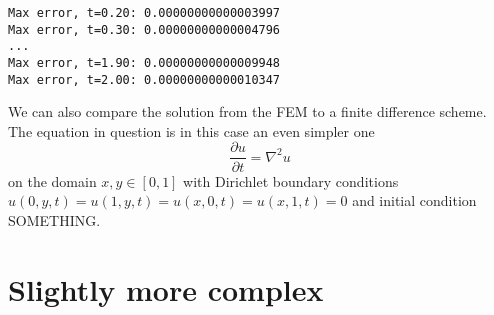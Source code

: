 \documentclass[a4paper,english, 10pt, twoside]{article}
\renewcommand{\d}{\partial}
\begin{document}
\begin{lstlisting}
Max error, t=0.20: 0.00000000000003997
Max error, t=0.30: 0.00000000000004796
...
Max error, t=1.90: 0.00000000000009948
Max error, t=2.00: 0.00000000000010347
\end{lstlisting}

We can also compare the solution from the FEM to a finite difference scheme. The equation in question is in this case an even simpler one
\begin{equation}
 \frac{\d u}{\d t} = \nabla^2u
\end{equation}
on the domain $x,y\in[0,1]$ with Dirichlet boundary conditions $u(0,y,t)=u(1,y,t)=u(x,0,t)=u(x,1,t) = 0$ and initial condition SOMETHING.

\section*{Slightly more complex}
\end{document}
